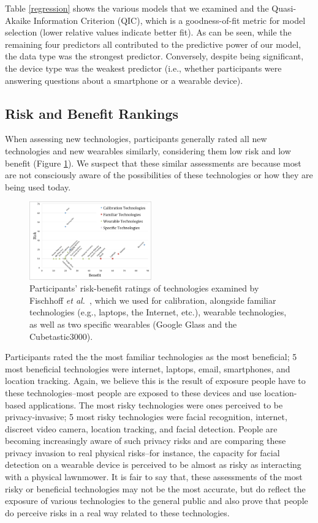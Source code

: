 \documentclass{acm_proc_article-sp}
\def\etal{{\it et al.~}}
\begin{document}
Table \ref{regression} shows the various models that we examined and the Quasi-Akaike Information Criterion (QIC), which is a goodness-of-fit metric for model selection (lower relative values indicate better fit). As can be seen, while the remaining four predictors all contributed to the predictive power of our model, the data type was the strongest predictor. Conversely, despite being significant, the device type was the weakest predictor (i.e., whether participants were answering questions about a smartphone or a wearable device).


\subsection{Risk and Benefit Rankings} 

When assessing new technologies, participants generally rated all new technologies and new wearables similarly, considering them low risk and low benefit (Figure \ref{fig:techplot}). We suspect that these similar assessments are because most are not consciously aware of the possibilities of these technologies or how they are being used today.


\begin{figure}
	\centering
	\includegraphics[width=0.47\textwidth]{riskbenefit.pdf}
	\caption{Participants' risk-benefit ratings of technologies examined by Fischhoff \etal\cite{Fischhoff}, which we used for calibration, alongside familiar technologies (e.g., laptops, the Internet, etc.), wearable technologies, as well as two specific wearables (Google Glass and the Cubetastic3000).}
	\label{fig:techplot}
\end{figure}


Participants rated the the most familiar technologies as the most beneficial; 5 most beneficial technologies were internet, laptops, email, smartphones, and location tracking. Again, we believe this is the result of exposure people have to these technologies--most people are exposed to these devices and use location-based applications. The most risky technologies were ones perceived to be privacy-invasive; 5 most risky technologies were facial recognition, internet, discreet video camera, location tracking, and facial detection. People are becoming increasingly aware of such privacy risks and are comparing these privacy invasion to real physical risks--for instance, the capacity for facial detection on a wearable device is perceived to be almost as risky as interacting with a physical lawnmower. It is fair to say that, these assessments of the most risky or beneficial technologies may not be the most accurate, but do reflect the exposure of various technologies to the general public and also prove that people do perceive risks in a real way related to these technologies. 
\end{document}
